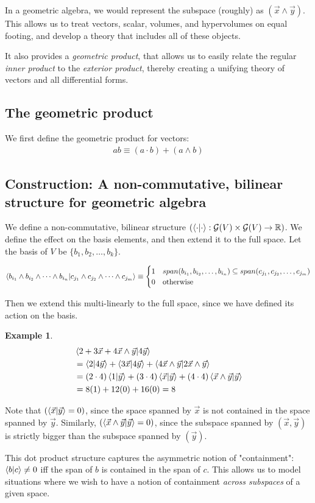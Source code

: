 \documentclass[11pt]{book}
\newcommand{\R}{\ensuremath{\mathbb R}}
\newcommand{\G}{\ensuremath{\mathcal{G}}}
\newtheorem{example}{Example}
\begin{document}
In a geometric algebra, we would represent the subspace (roughly) as $(\vec x \wedge \vec y)$.
This allows us to treat vectors, scalar, volumes, and hypervolumes on
equal footing, and develop a theory that includes all of these objects.

It also provides a \emph{geometric product}, that allows us to easily relate
the regular \emph{inner product} to the \emph{exterior product}, thereby
creating a unifying theory of vectors and all differential forms.

\subsection{The geometric product}

We first define the geometric product for vectors:
\begin{align*}
    ab \equiv (a \cdot b) + (a \wedge b)
\end{align*}


\subsection{Construction: A non-commutative, bilinear structure for geometric algebra}

We define a non-commutative, bilinear structure
$\left(\braket{\cdot}{\cdot}: \G(V) \times \G(V) \rightarrow \R\right)$. We
define the effect on the basis elements, and then extend it to the
full space. Let the basis of $V$ be $\{ b_1, b_2, \dots, b_k \}$.


\begin{align*}
\braket{b_{i_1} \wedge b_{i_2} \wedge \dots \wedge b_{i_n}}{c_{j_1} \wedge c_{j_2} \wedge \dots \wedge c_{j_m}}
\equiv
\begin{cases}
1 & span(b_{i_1}, b_{i_2}, \dots, b_{i_n}) \subseteq span(c_{j_1}, c_{j_2}, \dots, c_{j_m}) \\
0 & \text{otherwise}
\end{cases}
\end{align*}

Then we extend this multi-linearly to the full space, since we have defined its
action on the basis.

\begin{example}
\begin{align*}
&\braket{2 + 3\vec x + 4 \vec x \wedge \vec y}{4\vec y} \\
&= \braket{2}{4\vec y} +
 \braket{3\vec x}{4\vec y} +
 \braket{4 \vec x \wedge \vec y}{2 \vec x \wedge \vec y} \\
&= (2 \cdot 4)\braket{1}{\vec y} + 
   (3 \cdot 4) \braket{\vec x}{\vec y} + 
   (4 \cdot 4) \braket{\vec x \wedge \vec y}{\vec y} \\
&= 8 (1) + 12 (0) + 16 (0) = 8
\end{align*}
\end{example}
Note that $(\braket{\vec x}{\vec y} = 0)$, since the space spanned by $\vec x$
is not contained in the space spanned by $\vec y$. Similarly, 
$(\braket{\vec x \wedge \vec y}{\vec y} = 0)$, since the subspace spanned by
$(\vec x, \vec y)$ is strictly bigger than the subspace spanned by $(\vec y)$.


This dot product structure captures the asymmetric notion of "containment":
$\braket{b}{c} \neq 0$ iff the span of $b$ is contained in the span of $c$.
This allows us to model situations where we wish to have a notion of containment
\emph{across subspaces} of a given space.
\end{document}
